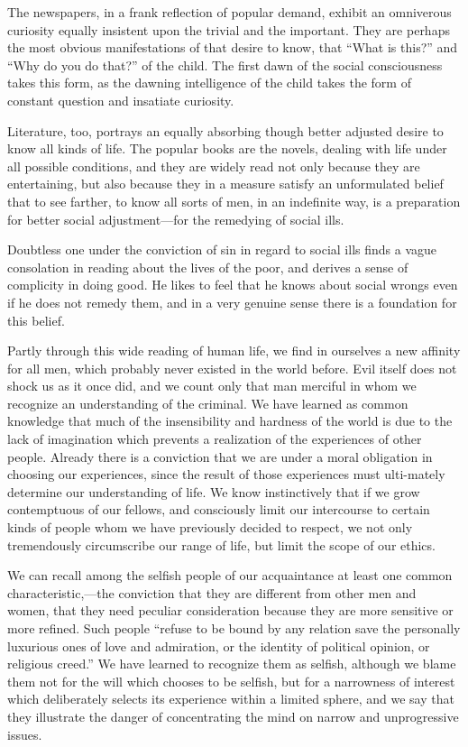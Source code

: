 The newspapers, in a frank reflection of popular demand, exhibit an
omniverous curiosity equally insistent upon the trivial and the
important. They are perhaps the most obvious manifestations of that
desire to know, that ``What is this?'' and ``Why do you do that?'' of
the child. The first dawn of the social consciousness takes this form,
as the dawning intelligence of the child takes the form of constant
question and insatiate curiosity.

Literature, too, portrays an equally absorbing though better adjusted
desire to know all kinds of life. The popular books are the novels,
dealing with life under all possible conditions, and they are widely
read not only because they are entertaining, but also because they in
a measure satisfy an unformulated belief that to see farther, to know
all sorts of men, in an indefinite way, is a preparation for better
social adjustment---for the remedying of social ills.

Doubtless one under the conviction of sin in regard to social
ills finds a vague consolation in reading about the lives of the poor,
and derives a sense of complicity in doing good. He likes to feel that
he knows about social wrongs even if he does not remedy them, and in a
very genuine sense there is a foundation for this belief.

Partly through this wide reading of human life, we find in ourselves a
new affinity for all men, which probably never existed in the world
before. Evil itself does not shock us as it once did, and we count
only that man merciful in whom we recognize an understanding of the
criminal. We have learned as common knowledge that much of the
insensibility and hardness of the world is due to the lack of
imagination which prevents a realization of the experiences of other
people. Already there is a conviction that we are under a moral
obligation in choosing our experiences, since the result of those
experiences must ulti-mately determine our understanding of
life. We know instinctively that if we grow contemptuous of our
fellows, and consciously limit our intercourse to certain kinds of
people whom we have previously decided to respect, we not only
tremendously circumscribe our range of life, but limit the scope of
our ethics.

We can recall among the selfish people of our acquaintance at least
one common characteristic,—the conviction that they are different from
other men and women, that they need peculiar consideration because
they are more sensitive or more refined. Such people ``refuse to be
bound by any relation save the personally luxurious ones of love and
admiration, or the identity of political opinion, or religious
creed.'' We have learned to recognize them as selfish, although we
blame them not for the will which chooses to be selfish, but for a
narrowness of interest which deliberately selects its experience
within a limited sphere, and we say that they illustrate the danger of
 concentrating the mind on narrow and unprogressive issues.

